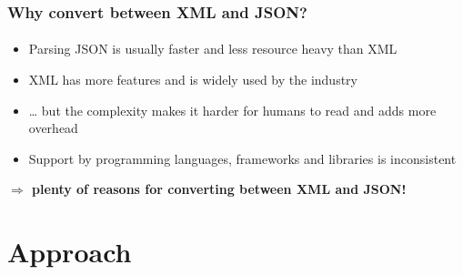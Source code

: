\documentclass[
    alternativetitlepage=alternativ,
    cornerlogo=hgi_nds_logo2,
    sectionoverview,
]{rubpresentation}
\begin{document}
\begin{frame}
    \frametitle{Why convert between XML and JSON?}
    \framesubtitle{}
    \begin{itemize}
        \item{} Parsing JSON is usually faster and less resource heavy than XML\\
        \item{} XML has more features and is widely used by the industry\\
        \item{} \dots{} but the complexity makes it harder for humans to read and adds more overhead\\
        \item{} Support by programming languages, frameworks and libraries is inconsistent\\
    \end{itemize}
    \begin{center}
        \bf $\Rightarrow$ plenty of reasons for converting between XML and JSON!
    \end{center}
\end{frame}

\section{Approach}
\end{document}
